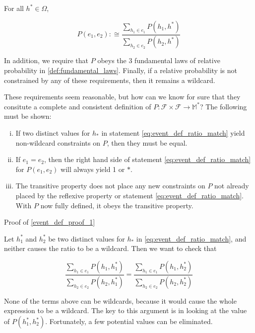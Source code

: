 \documentclass[twoside]{article}
\theoremstyle{plain}%
\theoremstyle{definition}
\theoremstyle{remark}
\begin{document}
For all \(h^* \in \Omega\),

\begin{equation}
\label{eq:event_def_ratio_match}
P(e_1, e_2) :\cong \frac{\sum_{h_1 \in e_1} P(h_1, h^*)}{\sum_{h_2 \in e_2} P(h_2, h^*)}
\end{equation}

In addition, we require that \(P\) obeys the 3 fundamental laws of relative probability in \ref{def:fundamental_laws}. Finally, if a relative probability is not constrained by any of these requirements, then it remains a wildcard.

These requirements seem reasonable, but how can we know for sure that they consitute a complete and consistent definition of \(P: \mathcal{F} \times \mathcal{F} \rightarrow \mathbb{M}^*\)? The following must be shown:

\begin{enumerate}[(i)]
  \item \label{event_def_proof_1} If two distinct values for \(h_*\) in statement \ref{eq:event_def_ratio_match} yield non-wildcard constraints on \(P\), then they must be equal.
  \item \label{event_def_proof_2} If \(e_1 = e_2\), then the right hand side of statement \ref{eq:event_def_ratio_match} for \(P(e_1, e_2)\) will always yield 1 or \(\ast\).
  \item \label{event_def_proof_3} The transitive property does not place any new constraints on \(P\) not already placed by the reflexive property or statement \ref{eq:event_def_ratio_match}. With \(P\) now fully defined, it obeys the transitive property.
\end{enumerate}

Proof of \ref{event_def_proof_1}

Let \(h_1^*\) and \(h_2^*\) be two distinct values for \(h_*\) in \ref{eq:event_def_ratio_match}, and neither causes the ratio to be a wildcard. Then we want to check that

\begin{equation}
\label{eq:relative_event_unique}
\frac{\sum_{h_1 \in e_1} P(h_1, h_1^*)}{\sum_{h_2 \in e_2} P(h_2, h_1^*)} = \frac{\sum_{h_1 \in e_1} P(h_1, h_2^*)}{\sum_{h_2 \in e_2} P(h_2, h_2^*)}
\end{equation}

None of the terms above can be wildcards, because it would cause the whole expression to be a wildcard. The key to this argument is in looking at the value of \(P(h_1^*, h_2^*)\). Fortunately, a few potential values can be eliminated.
\end{document}
